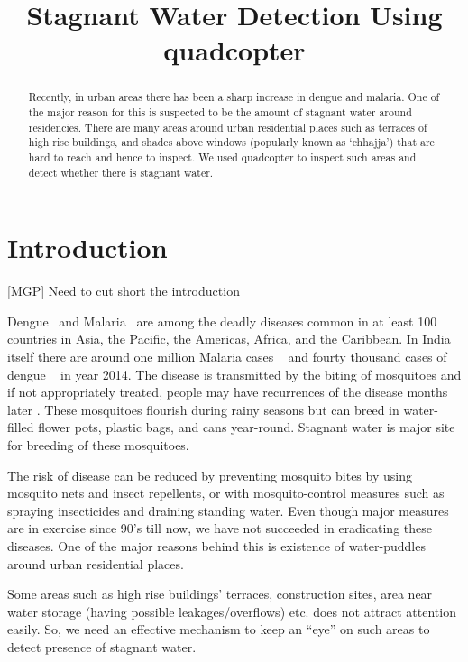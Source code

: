 \documentclass[times,10pt,twocolumn,letterpaper]{article}
\title{Stagnant Water Detection Using quadcopter}
\author{}
\begin{document}
\maketitle

\begin{abstract}
Recently, in urban areas there has been a sharp increase in dengue and malaria.
One of the major reason for this is suspected to be the amount of stagnant
water around residencies. There are many areas around urban residential places
such as terraces of high rise buildings, and shades above windows
(popularly known as `chhajja') that are hard to reach and hence to inspect. We
used quadcopter to inspect such areas and detect whether there is stagnant
water.

\end{abstract}

\section{Introduction}
{\color{red} [MGP] Need to cut short the introduction}

Dengue~\cite{WHO15Dengue} and Malaria~\cite{WHO15Malaria} are among the deadly
diseases common in at least 100 countries in Asia, the Pacific, the Americas,
Africa, and the Caribbean. In India itself there are around one million Malaria
cases ~\cite{NVBDP_Malaria} and fourty thousand cases of dengue
~\cite{NVBDP_Dengue} in year 2014. The disease is transmitted by the biting of
mosquitoes and if not appropriately treated, people may have recurrences of the
disease months later \cite{Cecilia14}. These mosquitoes flourish during rainy seasons but can breed
in water-filled flower pots, plastic bags, and cans year-round. Stagnant water
is major site for breeding of these mosquitoes.

The risk of disease can be reduced by preventing mosquito bites by using
mosquito nets and insect repellents, or with mosquito-control measures such as
spraying insecticides and draining standing water.  Even though major measures
are in exercise since 90’s till now, we have not succeeded in eradicating these
diseases. One of the major reasons behind this is existence of water-puddles
around urban residential places.

Some areas such as high rise buildings' terraces, construction sites, area
near water storage (having possible leakages/overflows) etc. does not attract
attention easily. So, we need an effective mechanism to keep an ``eye'' on such
areas to detect presence of stagnant water. 
\end{document}
